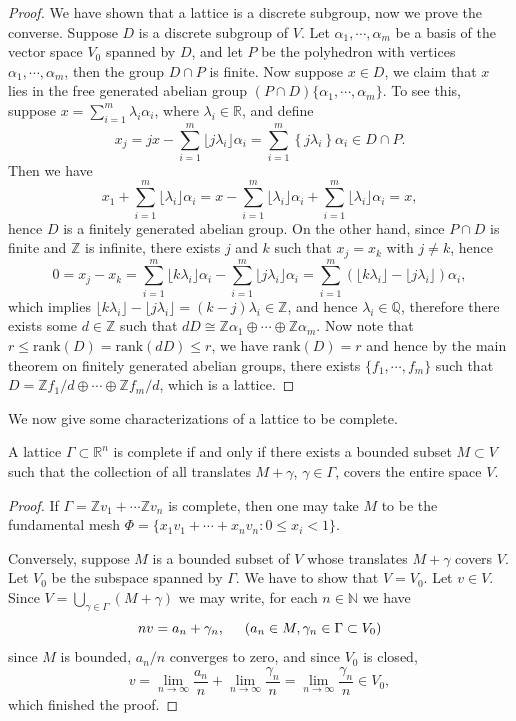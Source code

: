 \begin{proof}
We have shown that a lattice is a discrete subgroup, now we prove the converse. Suppose $D$ is a discrete subgroup of $V$. Let $\alpha_1,\cdots,\alpha_m$ be a basis of the vector space $V_0$ spanned by $D$, and let $P$ be the polyhedron with vertices $\alpha_1,\cdots,\alpha_m$, then the group $D\cap P$ is finite. Now suppose $x\in D$, we claim that $x$ lies in the free generated abelian group $(P\cap D)\{\alpha_1,\cdots,\alpha_m\}$. To see this, suppose $x=\sum_{i=1}^m\lambda_i\alpha_i$, where $\lambda_i\in\mathbb{R}$, and define 
$$
x_j=jx-\sum_{i=1}^m{\lfloor j\lambda _i \rfloor \alpha _i}=\sum_{i=1}^m{\left\{ j\lambda _i \right\} \alpha _i}\in D\cap P.
$$
Then we have 
$$
x_1+\sum_{i=1}^m{\lfloor \lambda _i \rfloor \alpha _i}=x-\sum_{i=1}^m{\lfloor \lambda _i \rfloor \alpha _i}+\sum_{i=1}^m{\lfloor \lambda _i \rfloor \alpha _i}=x,
$$
hence $D$ is a finitely generated abelian group. On the other hand, since $P\cap D$ is finite and $\mathbb{Z}$ is infinite, there exists $j$ and $k$ such that $x_j=x_k$ with $j\ne k$, hence 
$$
0=x_j-x_k=\sum_{i=1}^m{\lfloor k\lambda _i \rfloor \alpha _i}-\sum_{i=1}^m{\lfloor j\lambda _i \rfloor \alpha _i}=\sum_{i=1}^m{\left( \lfloor k\lambda _i \rfloor -\lfloor j\lambda _i \rfloor \right) \alpha _i},
$$
which implies $\lfloor k\lambda _i \rfloor -\lfloor j\lambda _i \rfloor =\left( k-j \right) \lambda _i\in \mathbb{Z} $, and hence $\lambda_i\in\mathbb{Q}$, therefore there exists some $d\in\mathbb{Z}$ such that $dD\cong \mathbb{Z} \alpha _1\oplus \cdots \oplus \mathbb{Z} \alpha _m$. Now note that $r\le \mathrm{rank}\left( D \right) =\mathrm{rank}\left( dD \right) \le r$, we have $\mathrm{rank}(D)=r$ and hence by the main theorem on finitely generated abelian groups, there exists $\{f_1,\cdots,f_m\}$ such that $D=\mathbb{Z} f_1/d\oplus \cdots \oplus \mathbb{Z} f_m/d$, which is a lattice.
\end{proof}
We now give some characterizations of a lattice to be complete.
\begin{proposition}
A lattice $\Gamma\subset\mathbb{R}^n$ is complete if and only if there exists a bounded subset $M\subset V$ such that the collection of all translates $M+\gamma$, $\gamma\in\Gamma$, covers the entire space $V$.
\end{proposition}
\begin{proof}
If $\Gamma=\mathbb{Z}v_1+\cdots\mathbb{Z}v_n$ is complete, then one may take $M$ to be the fundamental mesh $\Phi=\{x_1v_1+\cdots+x_nv_n:0\le x_i<1\}$.\par
Conversely, suppose $M$ is a bounded subset of $V$ whose translates $M+\gamma$ covers $V$. Let $V_0$ be the subspace spanned by $\Gamma$. We have to show that $V=V_0$. Let $v\in V$. Since $V=\bigcup_{\gamma\in\Gamma}(M+\gamma)$ we may write, for each $n\in\mathbb{N}$ we have 
$$
nv=a_n+\gamma _n,\hspace{0.5cm}\left( a_n\in M,\gamma _n\in \Gamma \subset V_0 \right) 
$$
since $M$ is bounded, $a_n/n$ converges to zero, and since $V_0$ is closed, 
$$
v=\lim_{n\rightarrow \infty} \frac{a_n}{n}+\lim_{n\rightarrow \infty} \frac{\gamma _n}{n}=\lim_{n\rightarrow \infty} \frac{\gamma _n}{n}\in V_0,
$$
which finished the proof.
\end{proof}

